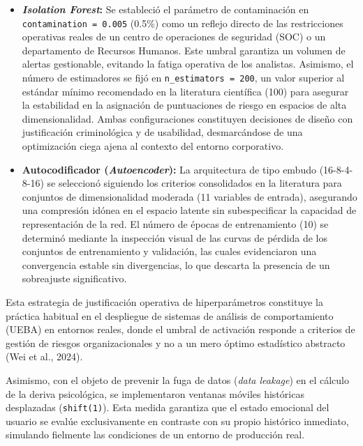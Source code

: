 \documentclass[IB]{TFUOC}%
\begin{document}
\begin{itemize}
    \item \textbf{\textit{Isolation Forest}:} Se estableció el parámetro de contaminación en \texttt{contamination = 0.005} (0.5\%) como un reflejo directo de las restricciones operativas reales de un centro de operaciones de seguridad (SOC) o un departamento de Recursos Humanos. Este umbral garantiza un volumen de alertas gestionable, evitando la fatiga operativa de los analistas. Asimismo, el número de estimadores se fijó en \texttt{n\_estimators = 200}, un valor superior al estándar mínimo recomendado en la literatura científica (100) para asegurar la estabilidad en la asignación de puntuaciones de riesgo en espacios de alta dimensionalidad. Ambas configuraciones constituyen decisiones de diseño con justificación criminológica y de usabilidad, desmarcándose de una optimización ciega ajena al contexto del entorno corporativo.
    
    \item \textbf{Autocodificador (\textit{Autoencoder}):} La arquitectura de tipo embudo (16-8-4-8-16) se seleccionó siguiendo los criterios consolidados en la literatura para conjuntos de dimensionalidad moderada (11 variables de entrada), asegurando una compresión idónea en el espacio latente sin subespecificar la capacidad de representación de la red. El número de épocas de entrenamiento (10) se determinó mediante la inspección visual de las curvas de pérdida de los conjuntos de entrenamiento y validación, las cuales evidenciaron una convergencia estable sin divergencias, lo que descarta la presencia de un sobreajuste significativo.
\end{itemize}

\noindent Esta estrategia de justificación operativa de hiperparámetros constituye la práctica habitual en el despliegue de sistemas de análisis de comportamiento (UEBA) en entornos reales, donde el umbral de activación responde a criterios de gestión de riesgos organizacionales y no a un mero óptimo estadístico abstracto (Wei et al., 2024).

\medskip
\noindent Asimismo, con el objeto de prevenir la fuga de datos (\textit{data leakage}) en el cálculo de la deriva psicológica, se implementaron ventanas móviles históricas desplazadas (\texttt{shift(1)}). Esta medida garantiza que el estado emocional del usuario se evalúe exclusivamente en contraste con su propio histórico inmediato, simulando fielmente las condiciones de un entorno de producción real.
\end{document}

